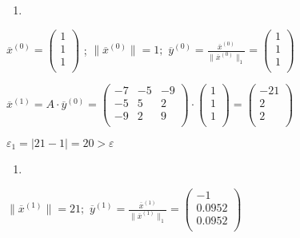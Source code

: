\documentclass[10pt, a4paper]{scrartcl}
\begin{document}
\begin{enumerate}
\def\labelenumi{\arabic{enumi})}
\item
\end{enumerate}

\(\displaystyle \overline{x}^{(0)} = \begin{pmatrix} 1\\ 1\\ 1\\ \end{pmatrix}\)
; \(\displaystyle \parallel \overline{x}^{(0)} \parallel = 1;\)
\(\displaystyle \overline{y}^{(0)} = \frac{\overline{x}^{(0)}}{\parallel \overline{x}^{(0)} \parallel _1} = \begin{pmatrix} 1\\ 1\\ 1\\ \end{pmatrix}\)

\(\displaystyle \overline{x}^{(1)} = A \cdot \overline{y}^{(0)} = \begin{pmatrix} -7 & -5 & -9\\ -5 & 5 & 2\\ -9 & 2 & 9\\ \end{pmatrix}\cdot\begin{pmatrix} 1\\ 1\\ 1\\ \end{pmatrix} = \begin{pmatrix} -21\\ 2\\ 2\\ \end{pmatrix}\)

\(\displaystyle \varepsilon_1 = |21 - 1| = 20 > \varepsilon\)

\begin{enumerate}
\def\labelenumi{\arabic{enumi})}
\setcounter{enumi}{1}
\item
\end{enumerate}

\(\displaystyle \parallel \overline{x}^{(1)} \parallel = 21;\)
\(\displaystyle \overline{y}^{(1)} = \frac{\overline{x}^{(1)}}{\parallel \overline{x}^{(1)} \parallel _1} = \begin{pmatrix} -1\\ 0.0952\\ 0.0952\\ \end{pmatrix}\)
\end{document}
